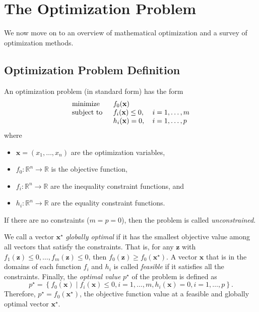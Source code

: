 \section{The Optimization Problem}
We now move on to an overview of mathematical optimization and a survey of optimization methods.
\subsection{Optimization Problem Definition}
\begin{defn}
	An optimization problem (in standard form) has the form
	\begin{equation}
		\begin{tabular}{lll}
			\text{minimize }   & $f_0(\mathbf{x})$        &                 \\
			\text{subject to } & $f_i(\mathbf{x})\leq 0$, & $i=1,\ldots, m$ \\
			& $h_i(\mathbf{x}) = 0$,   & $i=1,\ldots, p$ 
		\end{tabular}\label{Optimization}
	\end{equation}
	where
	\begin{itemize}
		\item $\mathbf{x}=\left(x_1,\ldots,x_n\right)$ are the optimization variables,
		\item $f_0 : \mathbb{R}^n\rightarrow\mathbb{R}$ is the objective function,
		\item $f_i : \mathbb{R}^n\rightarrow\mathbb{R}$ are the inequality constraint functions, and
		\item $h_i : \mathbb{R}^n\rightarrow\mathbb{R}$ are the equality constraint functions.
	\end{itemize}
\end{defn}
If there are no constraints ($m=p=0$), then the problem is called \textit{unconstrained}. \cite[p. 127]{Boyd2004}

We call a vector $\mathbf{x}^\star$ \textit{globally optimal} if it has the smallest objective value among all vectors that satisfy the constraints. That is, for any $\mathbf{z}$ with $f_1(\mathbf{z})\leq 0,\ldots, f_m(\mathbf{z})\leq 0$, then $f_0(\mathbf{z})\geq f_0(\mathbf{x}^\star)$. A vector $\mathbf{x}$ that is in the domains of each function $f_i$ and $h_i$ is called \textit{feasible} if it satisfies all the constraints. Finally, the \textit{optimal value} $p^\star$ of the problem is defined as $$p^\star=\left\lbrace f_0(\mathbf{x}) \mid f_i(\mathbf{x})\leq 0, i=1,\ldots,m, h_i(\mathbf{x})=0, i=1,\ldots,p\right\rbrace.$$ Therefore, $p^{\star}=f_0(\mathbf{x}^\star)$, the objective function value at a feasible and globally optimal vector $\mathbf{x}^{\star}$.

